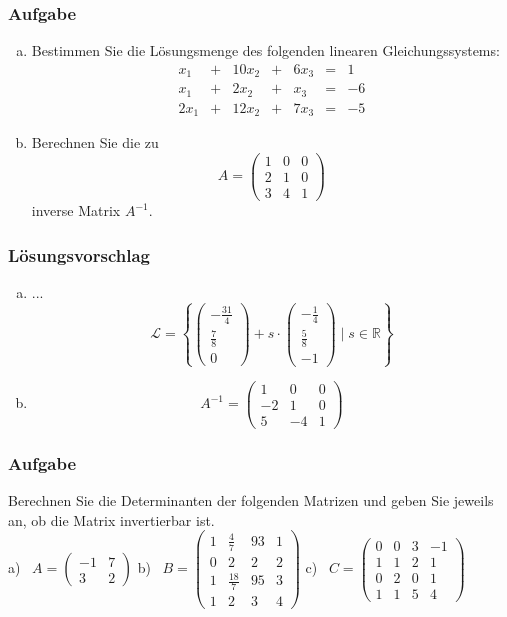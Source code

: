 \documentclass[a4paper,11pt]{scrartcl}
\newcounter{auf}
\newcommand{\Aufgabe}%
        {\addtocounter{auf}{1} \subsubsection*{\rmfamily  Aufgabe \theauf \hspace{1em}} }
\newcommand{\RR}{\mathbb{R}}
\begin{document}
\newpage
\Aufgabe
\begin{enumerate}[a)]
\item Bestimmen Sie die Lösungsmenge des folgenden linearen Gleichungssystems:
\[\begin{array}{rrrrrrrrr}
x_1&+&10x_2&+&6x_3&=&1\\
x_1&+&2x_2&+&x_3&=&-6\\
2x_1&+&12x_2&+&7x_3&=&-5
\end{array}\]
\item Berechnen Sie die zu 
$$
A=\begin{pmatrix} 1 & 0 &0 \\ 2 & 1 & 0 \\ 3 & 4 & 1 \end{pmatrix}
$$
inverse Matrix $A^{-1}$.
\end{enumerate}
%
%
\subsubsection*{Lösungsvorschlag}
\begin{enumerate}[a)]
\item ...
$$
\mathcal{L}=\left\{ \begin{pmatrix}-\frac{31}{4}\\\frac{7}{8}\\0 \end{pmatrix} +s \cdot \begin{pmatrix}-\frac{1}{4}\\\frac{5}{8}\\-1 \end{pmatrix} \mid s \in \RR \right\}
$$
\item $$
A^{-1}=\begin{pmatrix} 1 & 0 &0 \\ -2 & 1 & 0 \\ 5 & -4 & 1 \end{pmatrix}
$$
\end{enumerate}


\newpage
\Aufgabe
Berechnen Sie die Determinanten der folgenden Matrizen und geben Sie jeweils an, ob die Matrix invertierbar ist.\\
%
\hspace*{10mm} a) \ $A=\begin{pmatrix} -1 & 7 \\ 3 & 2 \end{pmatrix}$ \qquad
b) \ $B=\begin{pmatrix} 1 & \frac{4}{7} & 93 &1\\ 0 & 2 & 2 &2 \\1 & \frac{18}{7} & 95 &3 \\ 1& 2 &3 &4\end{pmatrix}$ \qquad
c) \ $C=\begin{pmatrix}0 & 0& 3 & -1 \\  1 & 1 &  2 & 1 \\ 0 & 2 & 0 & 1 \\ 1 & 1 & 5 & 4 \end{pmatrix}$
%
%
\end{document}
